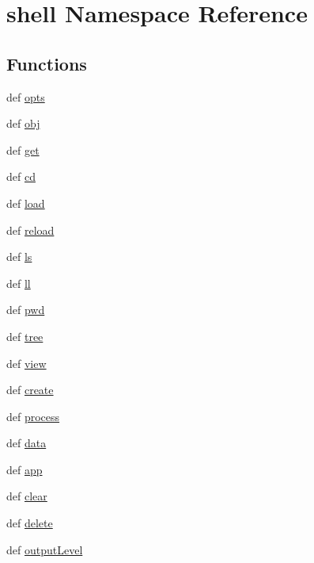 \hypertarget{namespaceshell}{
\section{shell Namespace Reference}
\label{namespaceshell}
}
\subsection*{Functions}
\begin{DoxyCompactItemize}
\item 
def \hyperlink{namespaceshell_abce87102a3fbbc7ae050316e8b4ac66f}{opts}
\item 
def \hyperlink{namespaceshell_aefddda8d474bea36a357e852eaa114cd}{obj}
\item 
def \hyperlink{namespaceshell_a8ba5de299d75ec2ee8ea88402a07ba47}{get}
\item 
def \hyperlink{namespaceshell_a66791c950f1dbb6d5fcf395d9a534b05}{cd}
\item 
def \hyperlink{namespaceshell_adb0ae939e9986342e61b1bb10770cb20}{load}
\item 
def \hyperlink{namespaceshell_a36c588aba63a5a7695f935a08536c366}{reload}
\item 
def \hyperlink{namespaceshell_a54a12b6d3621825fa1061475646836bf}{ls}
\item 
def \hyperlink{namespaceshell_a6d2e8102d1709f7f0f171bca182dcae8}{ll}
\item 
def \hyperlink{namespaceshell_a358e751a326de2a94f6b5905cfdf6def}{pwd}
\item 
def \hyperlink{namespaceshell_aa529082bccc6880160c24f417d8d4868}{tree}
\item 
def \hyperlink{namespaceshell_a08095b8594376efea24bd0f8b8bc5c07}{view}
\item 
def \hyperlink{namespaceshell_ac23ebd11b2ad5660ac161b24297dd2c2}{create}
\item 
def \hyperlink{namespaceshell_a9cb3ff540ee16ae2399dd7a2cc10a740}{process}
\item 
def \hyperlink{namespaceshell_a3c1788d69046b9e508b31e01b5cf71fc}{data}
\item 
def \hyperlink{namespaceshell_a3a6f36f67bd643e51b6f286fb56918e5}{app}
\item 
def \hyperlink{namespaceshell_aeef375fe6412bd4da281ceaac2fad6b0}{clear}
\item 
def \hyperlink{namespaceshell_a2fba7cda81dff6d2d8b092dbd17fd429}{delete}
\item 
def \hyperlink{namespaceshell_ad5ae40bbfdb1f4e1c5778aa23a7db3aa}{outputLevel}

\end{DoxyCompactItemize}
